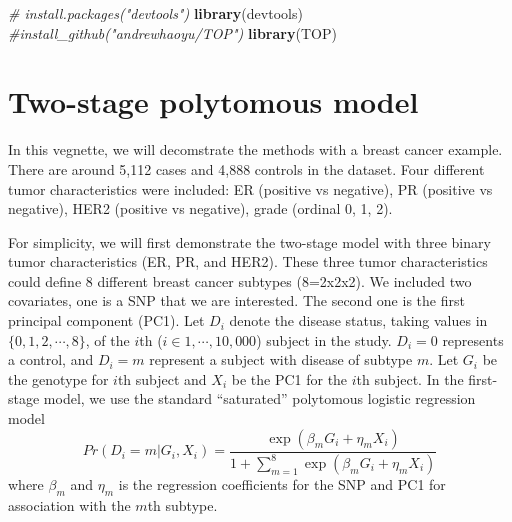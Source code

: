 \documentclass[11pt,]{article}
\newenvironment{Shaded}{\begin{snugshade}}{\end{snugshade}}
\newcommand{\KeywordTok}[1]{\textcolor[rgb]{0.13,0.29,0.53}{\textbf{#1}}}
\newcommand{\CommentTok}[1]{\textcolor[rgb]{0.56,0.35,0.01}{\textit{#1}}}
\newcommand{\NormalTok}[1]{#1}
\begin{document}
\begin{Shaded}
\begin{Highlighting}[]
\CommentTok{# install.packages("devtools")}
\KeywordTok{library}\NormalTok{(devtools)  }
\CommentTok{#install_github("andrewhaoyu/TOP")}
\KeywordTok{library}\NormalTok{(TOP)}
\end{Highlighting}
\end{Shaded}

\section{Two-stage polytomous model}\label{two-stage-polytomous-model}

In this vegnette, we will decomstrate the methods with a breast cancer
example. There are around 5,112 cases and 4,888 controls in the dataset.
Four different tumor characteristics were included: ER (positive vs
negative), PR (positive vs negative), HER2 (positive vs negative), grade
(ordinal 0, 1, 2).

For simplicity, we will first demonstrate the two-stage model with three
binary tumor characteristics (ER, PR, and HER2). These three tumor
characteristics could define 8 different breast cancer subtypes
(8=2x2x2). We included two covariates, one is a SNP that we are
interested. The second one is the first principal component (PC1). Let
\(D_{i}\) denote the disease status, taking values in
\(\{0,1,2,\cdots,8\}\), of the \(i\)th (\(i \in 1, \cdots, 10,000\))
subject in the study. \(D_{i}=0\) represents a control, and \(D_{i}=m\)
represent a subject with disease of subtype \(m\). Let \(G_i\) be the
genotype for \(i\)th subject and \(X_i\) be the PC1 for the \(i\)th
subject. In the first-stage model, we use the standard ``saturated''
polytomous logistic regression model
\[ Pr(D_{i}=m|G_i,X_{i})=\frac{\exp(\beta_m G_i+\eta_m X_i)}{1+\sum_{m=1}^{8}\exp(\beta_m G_i+\eta_{m}X_{i})}\]
where \(\beta_{m}\) and \(\eta_{m}\) is the regression coefficients for
the SNP and PC1 for association with the \(m\)th subtype.
\end{document}

